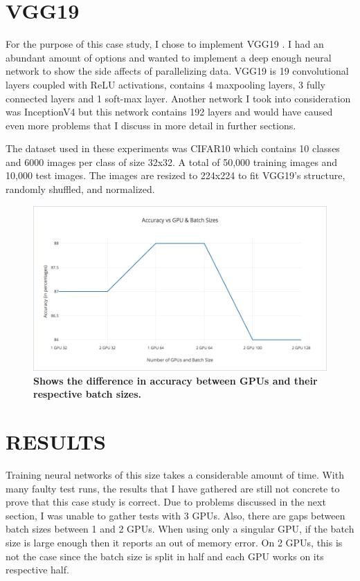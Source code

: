\documentclass[12pt,conference]{ieeeconf}
\begin{document}
\section{VGG19}
	For the purpose of this case study, I chose to implement VGG19 \cite{VGG19}. I had an abundant amount of options and wanted to implement a deep enough neural network to show the side affects of parallelizing data. VGG19 is 19 convolutional layers coupled with ReLU activations, contains 4 maxpooling layers, 3 fully connected layers and 1 soft-max layer. Another network I took into consideration was InceptionV4 \cite{IN4} but this network contains 192 layers and would have caused even more problems that I discuss in more detail in further sections.
	
	The dataset used in these experiments was CIFAR10 which contains 10 classes and 6000 images per class of size 32x32. A total of 50,000 training images and 10,000 test images. The images are resized to 224x224 to fit VGG19's structure, randomly shuffled, and normalized.
	
\begin{figure}
\begin{center}
\includegraphics[width=2.0\columnwidth]{Accuracy}
\end{center}
	\caption{\textbf{Shows the difference in accuracy between GPUs and their respective batch sizes.}}
\label{fig:ACC}
\end{figure}
	
\section{RESULTS}
	Training neural networks of this size takes a considerable amount of time. With many faulty test runs, the results that I have gathered are still not concrete to prove that this case study is correct. Due to problems discussed in the next section, I was unable to gather tests with 3 GPUs. Also, there are gaps between batch sizes between 1 and 2 GPUs. When using only a singular GPU, if the batch size is large enough then it reports an out of memory error. On 2 GPUs, this is not the case since the batch size is split in half and each GPU works on its respective half.
	
\end{document}
